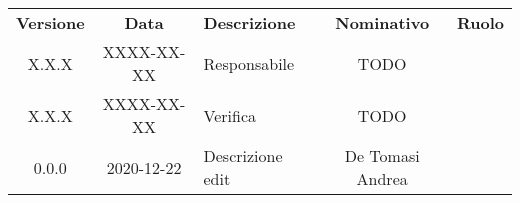{
    \renewcommand{\arraystretch}{1.5}
    \centering
    \begin{longtable}{ c c  C{4cm}  c  c }
        \rowcolor{\primaryColor}
        \textcolor{\secondaryColor}{
        \textbf{Versione}}     & \textcolor{\secondaryColor}{\textbf{Data}}       & \textcolor{\secondaryColor}
        {\textbf{Descrizione}} & \textcolor{\secondaryColor}{\textbf{Nominativo}} & \textcolor{\secondaryColor}{\textbf{Ruolo}}                          \\


        X.X.X                  & XXXX-XX-XX                                       & Responsabile                                & TODO & \responsabile{} \\
        X.X.X                  & XXXX-XX-XX                                       & Verifica                                    & TODO & \verificatore{} \\
        0.0.0                  & 2020-12-22                                       & Descrizione edit                            & De Tomasi Andrea & \redattore{}    \\
    \end{longtable}
}